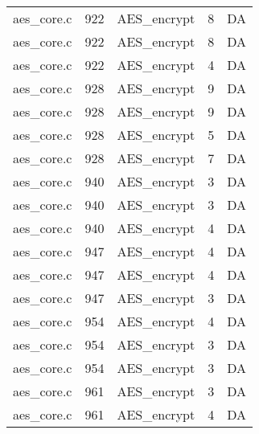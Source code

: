 \begin{table}
\begin{tabular}{clrrr}
aes\_core.c& 922&AES\_encrypt&8 &DA\\
aes\_core.c& 922&AES\_encrypt&8 &DA\\
aes\_core.c& 922&AES\_encrypt&4 &DA\\
aes\_core.c& 928&AES\_encrypt&9 &DA\\
aes\_core.c& 928&AES\_encrypt&9 &DA\\
aes\_core.c& 928&AES\_encrypt&5 &DA\\
aes\_core.c& 928&AES\_encrypt&7 &DA\\
aes\_core.c& 940&AES\_encrypt&3 &DA\\
aes\_core.c& 940&AES\_encrypt&3 &DA\\
aes\_core.c& 940&AES\_encrypt&4 &DA\\
aes\_core.c& 947&AES\_encrypt&4 &DA\\
aes\_core.c& 947&AES\_encrypt&4 &DA\\
aes\_core.c& 947&AES\_encrypt&3 &DA\\
aes\_core.c& 954&AES\_encrypt&4 &DA\\
aes\_core.c& 954&AES\_encrypt&3 &DA\\
aes\_core.c& 954&AES\_encrypt&3 &DA\\
aes\_core.c& 961&AES\_encrypt&3 &DA\\
aes\_core.c& 961&AES\_encrypt&4 &DA\\
\hline
\end{tabular}
\end{table}